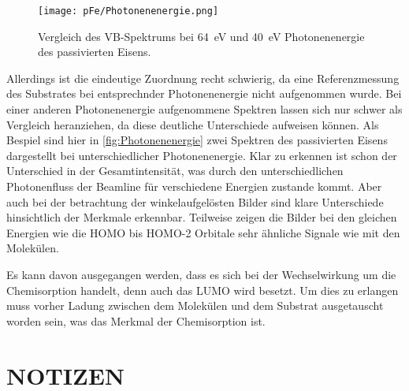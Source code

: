         \begin{figure}
            \centering
            \texttt{[image: pFe/Photonenenergie.png]}
            \caption{Vergleich des VB-Spektrums bei \SI{64}{\electronvolt} und \SI{40}{\electronvolt} Photonenenergie des passivierten Eisens.}
            \label{fig:Photonenenergie}
        \end{figure}
        Allerdings ist die eindeutige Zuordnung recht schwierig, da eine Referenzmessung des Substrates bei entsprechnder Photonenenergie nicht aufgenommen wurde.
        Bei einer anderen Photonenenergie aufgenommene Spektren lassen sich nur schwer als Vergleich heranziehen, da diese deutliche Unterschiede aufweisen können.
        Als Bespiel sind hier in \autoref{fig:Photonenenergie} zwei Spektren des passivierten Eisens dargestellt bei unterschiedlicher Photonenenergie.
        Klar zu erkennen ist schon der Unterschied in der Gesamtintensität, was durch den unterschiedlichen Photonenfluss der Beamline für verschiedene Energien zustande kommt.
        Aber auch bei der betrachtung der winkelaufgelösten Bilder sind klare Unterschiede hinsichtlich der Merkmale erkennbar.
        Teilweise zeigen die Bilder bei den gleichen Energien wie die HOMO bis HOMO-2 Orbitale sehr ähnliche Signale wie mit den Molekülen.

        Es kann davon ausgegangen werden, dass es sich bei der Wechselwirkung um die Chemisorption handelt, denn auch das LUMO wird besetzt.
        Um dies zu erlangen muss vorher Ladung zwischen dem Molekülen und dem Substrat ausgetauscht worden sein, was das Merkmal der Chemisorption ist.

  
    \section{NOTIZEN}
